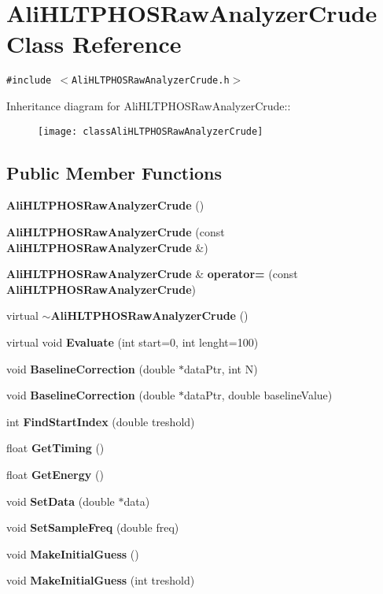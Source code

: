 \section{Ali\-HLTPHOSRaw\-Analyzer\-Crude Class Reference}
\label{classAliHLTPHOSRawAnalyzerCrude}
{\tt \#include $<$Ali\-HLTPHOSRaw\-Analyzer\-Crude.h$>$}

Inheritance diagram for Ali\-HLTPHOSRaw\-Analyzer\-Crude::\begin{figure}[H]
\begin{center}
\leavevmode
\texttt{[image: classAliHLTPHOSRawAnalyzerCrude]}
\end{center}
\end{figure}
\subsection*{Public Member Functions}
\begin{CompactItemize}
\item 
{\bf Ali\-HLTPHOSRaw\-Analyzer\-Crude} ()
\item 
{\bf Ali\-HLTPHOSRaw\-Analyzer\-Crude} (const {\bf Ali\-HLTPHOSRaw\-Analyzer\-Crude} \&)
\item 
{\bf Ali\-HLTPHOSRaw\-Analyzer\-Crude} \& {\bf operator=} (const {\bf Ali\-HLTPHOSRaw\-Analyzer\-Crude})
\item 
virtual {\bf $\sim$Ali\-HLTPHOSRaw\-Analyzer\-Crude} ()
\item 
virtual void {\bf Evaluate} (int start=0, int lenght=100)
\item 
void {\bf Baseline\-Correction} (double $\ast$data\-Ptr, int N)
\item 
void {\bf Baseline\-Correction} (double $\ast$data\-Ptr, double baseline\-Value)
\item 
int {\bf Find\-Start\-Index} (double treshold)
\item 
float {\bf Get\-Timing} ()
\item 
float {\bf Get\-Energy} ()
\item 
void {\bf Set\-Data} (double $\ast$data)
\item 
void {\bf Set\-Sample\-Freq} (double freq)
\item 
void {\bf Make\-Initial\-Guess} ()
\item 
void {\bf Make\-Initial\-Guess} (int treshold)
\end{CompactItemize}
